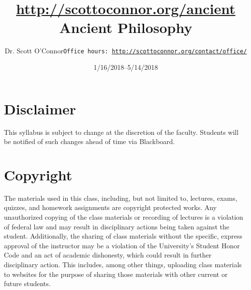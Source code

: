 \documentclass[article,oneside]{memoir}
\def\myauthor{Author}
\def\mytitle{Title}
\def\mycopyright{\myauthor}
\def\myweb{\href{http://scottoconnor.org/ancient}{http://scottoconnor.org/ancient}}
\def\myauthor{Dr. Scott O'Connor}
\def\mytitle{{\normalsize \myweb \newline} \HUGE Ancient Philosophy}
\begin{document}
\setsansfont[Mapping=tex-text]{Myriad Pro} 
\setmonofont[Mapping=tex-text,Scale=0.8]{Georgia} 

\def\ind{\hangindent=1 true cm\hangafter=1 \noindent}
\def\labelitemi{$\cdot$}


\title{\LARGE \mytitle}     
\author{\Large\myauthor \newline \footnotesize\texttt{\noindent Office hours: \href{http://scottoconnor.org/contact/office/}{http://scottoconnor.org/contact/office/}}}
\date{1/16/2018--5/14/2018}


\maketitle




%
%


\section{Disclaimer}
 This syllabus is subject to change at the discretion of the faculty. Students will be notified of such changes ahead of time via Blackboard. 


\section{Copyright}
The materials used in this class, including, but not limited to, lectures, exams, quizzes, and homework assignments are copyright protected works.  Any unauthorized copying of the class materials or recording of lectures is a violation of federal law and may result in disciplinary actions being taken against the student.  Additionally, the sharing of class materials without the specific, express approval of the instructor may be a violation of the University's Student Honor Code and an act of academic dishonesty, which could result in further disciplinary action.  This includes, among other things, uploading class materials to websites for the purpose of sharing those materials with other current or future students. 
\end{document}
